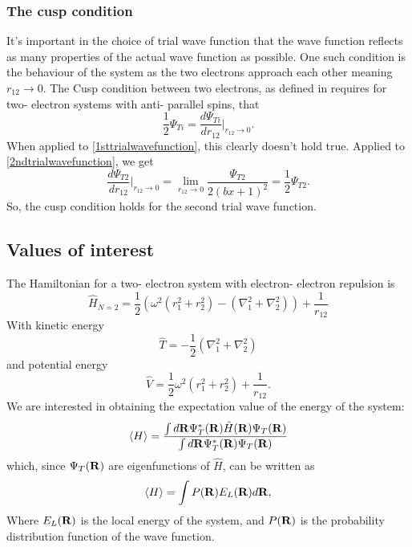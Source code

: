 \documentclass[10pt,a4paper]{article}
\begin{document}
\subsubsection{The cusp condition}
It's important in the choice of trial wave function that the wave function reflects as many properties of the actual wave function as possible. One such condition is the behaviour of the system as the two electrons approach each other meaning $r_{12}\rightarrow 0$. The Cusp condition between two electrons, as defined in \cite{Lecture_Notes_Fall_2015} requires for two- electron systems with anti- parallel spins, that
\begin{equation}
\frac{1}{2}\Psi_{Ti} =\dfrac{d\Psi_{Ti}}{dr_{12}} \Bigg|_{r_{12}\rightarrow 0}.
\end{equation}
When applied to \eqref{1sttrialwavefunction}, this clearly doesn't hold true. Applied to \eqref{2ndtrialwavefunction}, we get
\begin{equation}
\dfrac{d\Psi_{T2}}{dr_{12}} \Bigg|_{r_{12}\rightarrow 0} = \lim_{r_{12}\rightarrow 0} \frac{\Psi_{T2}}{2\left(bx+1\right)^2} = \frac{1}{2}\Psi_{T2}.
\end{equation}
So, the cusp condition holds for the second trial wave function.
\subsection{Values of interest}

The Hamiltonian for a two- electron system with electron- electron repulsion is
\begin{equation}
\hat{H}_{N=2} = \frac{1}{2}\left( \omega^2   \left( r_1^2+r_2^2 \right)-\left( \nabla_1^2 + \nabla_2^2 \right)  \right)+\frac{1}{r_{12}}
\end{equation}
With kinetic energy 
\begin{equation}
\hat{T} = - \frac{1}{2}\left( \nabla_1^2 + \nabla_2^2 \right) 
\end{equation}
and potential energy 
\begin{equation}
\hat{V}=  \frac{1}{2} \omega^2   \left( r_1^2+r_2^2 \right) +\frac{1}{r_{12}}.
\end{equation}
We are interested in obtaining the expectation value of the energy of the system:
\begin{equation}
\langle H \rangle = \frac{\int d{\bf
R}\Psi^{\ast}_T({\bf R})\hat{H}({\bf R})\Psi_T({\bf R})}
{\int d{\bf
R}\Psi^{\ast}_T({\bf R})\Psi_T({\bf R})}
\end{equation}
which, since $\Psi_T({\bf R})$ are eigenfunctions of $\hat{H}$, can be written as 
\begin{equation}\label{Energy_expectation_value}
\langle H \rangle =\int P({\bf R})E_L({\bf R})d{\bf R},
\end{equation}
Where $E_L({\bf R})$ is the local energy of the system, and $P({\bf R})$ is the probability distribution function of the wave function.
\end{document}
